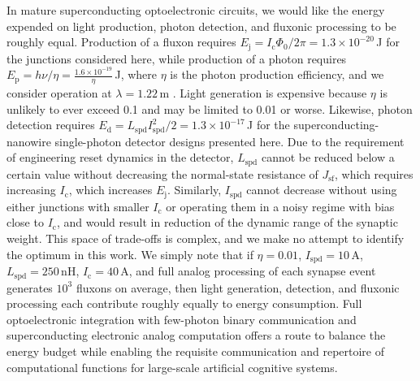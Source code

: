 \documentclass[twocolumn]{article}
\begin{document}
In mature superconducting optoelectronic circuits, we would like the energy expended on light production, photon detection, and fluxonic processing to be roughly equal. Production of a fluxon requires $E_{\mathrm{j}} = I_{\mathrm{c}}\Phi_0/2\pi = 1.3\times 10^{-20}$\,J for the junctions considered here, while production of a photon requires $E_{\mathrm{p}} = h\nu/\eta = \frac{1.6\times 10^{-19}}{\eta}$\,J, where $\eta$ is the photon production efficiency, and we consider operation at $\lambda = 1.22$\,\textmu m \cite{buch2017}. Light generation is expensive because $\eta$ is unlikely to ever exceed 0.1 and may be limited to 0.01 or worse. Likewise, photon detection requires $E_{\mathrm{d}} = L_{\mathrm{spd}}I_{\mathrm{spd}}^2/2 = 1.3\times 10^{-17}$\,J for the superconducting-nanowire single-photon detector designs presented here. Due to the requirement of engineering reset dynamics in the detector, $L_{\mathrm{spd}}$ cannot be reduced below a certain value without decreasing the normal-state resistance of $J_{\mathrm{sf}}$, which requires increasing $I_{\mathrm{c}}$, which increases $E_{\mathrm{j}}$. Similarly, $I_{\mathrm{spd}}$ cannot decrease without using either junctions with smaller $I_{\mathrm{c}}$ or operating them in a noisy regime with bias close to $I_{\mathrm{c}}$, and would result in reduction of the dynamic range of the synaptic weight. This space of trade-offs is complex, and we make no attempt to identify the optimum in this work. We simply note that if $\eta = 0.01$, $I_{\mathrm{spd}} = 10$\,\textmu A, $L_{\mathrm{spd}} = 250$\,nH, $I_{\mathrm{c}} = 40$\,\textmu A, and full analog processing of each synapse event generates $10^3$ fluxons on average, then light generation, detection, and fluxonic processing each contribute roughly equally to energy consumption. Full optoelectronic integration with few-photon binary communication and superconducting electronic analog computation offers a route to balance the energy budget while enabling the requisite communication and repertoire of computational functions for large-scale artificial cognitive systems.
\end{document}
